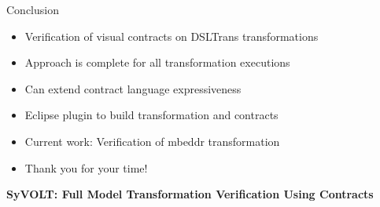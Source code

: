 \documentclass[12pt, handout]{beamer}
\newcommand\blfootnote[1]{%
  \begingroup
  \renewcommand\thefootnote{}\footnote{#1}%
  \addtocounter{footnote}{-1}%
  \endgroup
}
\begin{document}
\begin{frame}{Conclusion}
\begin{itemize}[<+->]
\item Verification of visual contracts on DSLTrans transformations
\item Approach is complete for all transformation executions
\item Can extend contract language expressiveness
\item Eclipse plugin to build transformation and contracts
\item Current work: Verification of mbeddr transformation
\end{itemize}
\pause
\begin{itemize}
\item Thank you for your time!
\end{itemize}
\begin{center}
\textbf{SyVOLT: Full Model Transformation Verification Using Contracts}\\
\end{center}
\end{frame}


%
%
%
%
\end{document}
